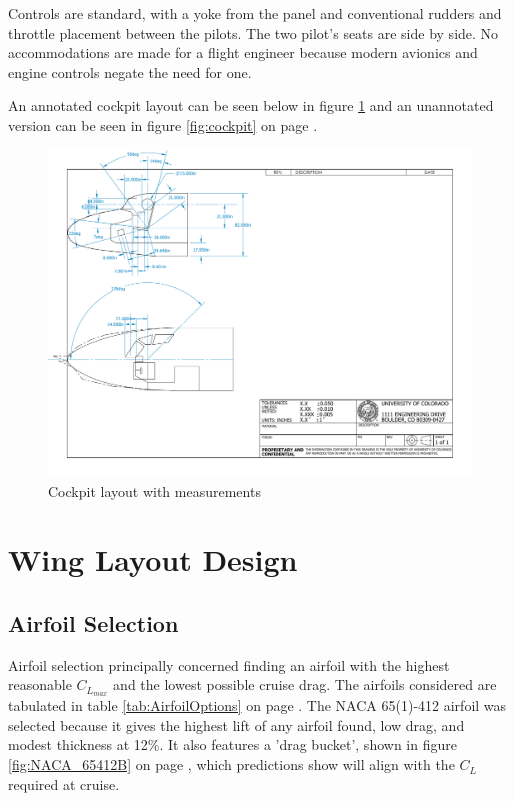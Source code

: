 \documentclass[conf]{new-aiaa}
\begin{document}
Controls are standard, with a yoke from the panel and conventional rudders and throttle placement between the pilots. The two pilot's seats are side by side. No accommodations are made for a flight engineer because modern avionics and engine controls negate the need for one.

An annotated cockpit layout can be seen below in figure \ref{fig:cockpit_annotated} and an unannotated version can be seen in figure \ref{fig:cockpit} on page \pageref{fig:cockpit}.

\begin{figure}[H]
    \centering
    \includegraphics[angle=90, width=\textwidth]{plots/cockpit_annotated}
    \caption{Cockpit layout with measurements}
    \label{fig:cockpit_annotated}
\end{figure}

\section{Wing Layout Design}
\subsection{Airfoil Selection}
Airfoil selection principally concerned finding an airfoil with the highest reasonable 
$C_{L_{max}}$ and the lowest possible cruise drag. The airfoils considered are tabulated in 
table \ref{tab:AirfoilOptions} on page \pageref{tab:AirfoilOptions}. The NACA 65(1)-412 airfoil was selected because 
it gives the highest lift of any airfoil found, low drag, and modest thickness at 12\%. It also features a 'drag bucket', shown in figure \ref{fig:NACA_65412B} on page \pageref{fig:NACA_65412B}, which predictions show will align with the $C_L$ required at cruise.
\end{document}
